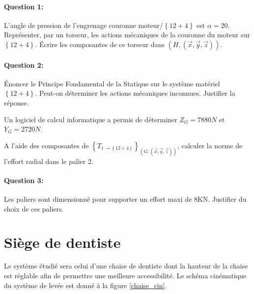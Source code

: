 \paragraph{Question 1:} L'angle de pression de l'engrenage couronne moteur/$\left\{12+4\right\}$ est $\alpha=20$\textdegree.
Représenter, par un torseur, les actions mécaniques de la couronne du moteur sur $\left\{12+4\right\}$.
Écrire les composantes de ce torseur dans $(H,(\overrightarrow{x},\overrightarrow{y},\overrightarrow{z}))$.

\paragraph{Question 2:} Énoncer le Principe Fondamental de la Statique sur le système matériel $\left\{12+4\right\}$. Peut-on déterminer les actions mécaniques inconnues. Justifier la réponse.

Un logiciel de calcul informatique a permis de déterminer $Z_G = 7880 N$ et $Y_G = 2720 N$.

A l'aide des composantes de $\left\{T_{1 \rightarrow \left\{12+4\right\}}\right\}_{(G,(\overrightarrow{x},\overrightarrow{y},\overrightarrow{z}))}$, calculer la norme de l'effort radial dans le palier 2.

\paragraph{Question 3:} Les paliers sont dimensionné pour supporter un effort maxi de 8KN. Justifier du choix de ces paliers.

\newpage



%


\newpage

\section{Siège de dentiste}

Le système étudié sera celui d'une chaise de dentiste dont la hauteur de la chaise est réglable afin de permettre une meilleure accessibilité. Le schéma cinématique du système de levée est donné à la figure \ref{chaise_cin}.

